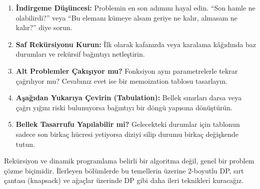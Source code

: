 \begin{enumerate}
    \item \textbf{İndirgeme Düşüncesi:} Problemin en son adımını hayal edin. ``Son hamle ne olabilirdi?'' veya ``Bu elemanı kümeye alsam geriye ne kalır, almasam ne kalır?'' diye sorun.
    \item \textbf{Saf Rekürsiyonu Kurun:} İlk olarak kafanızda veya karalama kâğıdında baz durumları ve rekürsif bağıntıyı netleştirin.
    \item \textbf{Alt Problemler Çakışıyor mu?} Fonksiyon aynı parametrelerle tekrar çağrılıyor mu? Cevabınız evet ise bir memoization tablosu tasarlayın.
    \item \textbf{Aşağıdan Yukarıya Çevirin (Tabulation):} Bellek sınırları darsa veya çağrı yığını riski bulunuyorsa bağıntıyı bir döngü yapısına dönüştürün.
    \item \textbf{Bellek Tasarrufu Yapılabilir mi?} Gelecekteki durumlar için tablonun sadece son birkaç hücresi yetiyorsa diziyi silip durumu birkaç değişkende tutun.
\end{enumerate}

Rekürsiyon ve dinamik programlama belirli bir algoritma değil, genel bir problem çözme biçimidir. İlerleyen bölümlerde bu temellerin üzerine 2-boyutlu DP, sırt çantası (knapsack) ve ağaçlar üzerinde DP gibi daha ileri teknikleri kuracağız.
